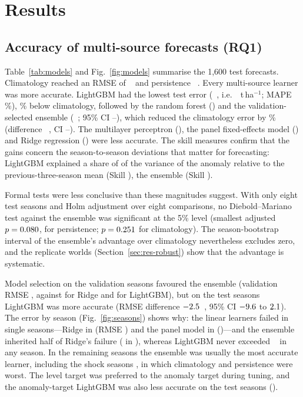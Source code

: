 \section{Results}\label{sec:results}

\subsection{Accuracy of multi-source forecasts (RQ1)}
Table~\ref{tab:models} and Fig.~\ref{fig:models} summarise the 1{,}600 test forecasts. Climatology reached an RMSE of \rmseClim~\kgrai{} and persistence \rmsePers~\kgrai. Every multi-source learner was more accurate. LightGBM had the lowest test error (\rmseLGB~\kgrai, i.e.\ \thaLGB~t\,ha$^{-1}$; MAPE \mapeLGB\%), \redClimLGBPct\% below climatology, followed by the random forest (\rmseRF) and the validation-selected ensemble (\rmseMain~\kgrai; 95\% CI \rmseLoMain--\rmseHiMain), which reduced the climatology error by \redClimPct\% (difference \drmseClim~\kgrai, CI \drmseLoClim--\drmseHiClim). The multilayer perceptron (\rmseMLP), the panel fixed-effects model (\rmseFE) and Ridge regression (\rmseRidge) were less accurate. The skill measures confirm that the gains concern the season-to-season deviations that matter for forecasting: LightGBM explained a share of \rtwoanomLGB{} of the variance of the anomaly relative to the previous-three-season mean (Skill \skillLGB), the ensemble \rtwoanomMain{} (Skill \skillMain).

Formal tests were less conclusive than these magnitudes suggest. With only eight test seasons and Holm adjustment over eight comparisons, no Diebold--Mariano test against the ensemble was significant at the 5\% level (smallest adjusted $p=0.080$, for persistence; $p=0.251$ for climatology). The season-bootstrap interval of the ensemble's advantage over climatology nevertheless excludes zero, and the replicate worlds (Section~\ref{sec:res-robust}) show that the advantage is systematic.

Model selection on the validation seasons favoured the ensemble (validation RMSE \valRmseEns, against \valRmseRidge{} for Ridge and \valRmseLGB{} for LightGBM), but on the test seasons LightGBM was more accurate (RMSE difference $-2.5$~\kgrai, 95\% CI $-9.6$ to $2.1$). The error by season (Fig.~\ref{fig:seasons}) shows why: the linear learners failed in single seasons---Ridge in \worstYearRidge{} (RMSE \worstRidge) and the panel model in \worstYearFE{} (\worstFE)---and the ensemble inherited half of Ridge's failure (\worstEns{} in \worstYearEns), whereas LightGBM never exceeded \worstLGB~\kgrai{} in any season. In the remaining seasons the ensemble was usually the most accurate learner, including the shock seasons \shockYears, in which climatology and persistence were worst. The level target was preferred to the anomaly target during tuning, and the anomaly-target LightGBM was also less accurate on the test seasons (\rmseLGBalt).


